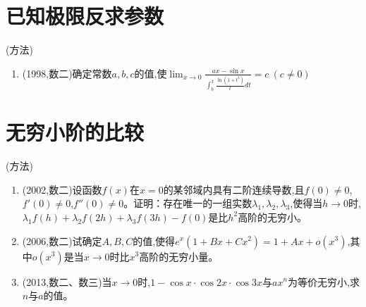 \documentclass[12pt, a4paper, oneside, UTF8]{ctexbook}
\begin{document}
\section{已知极限反求参数}
\begin{remark}(方法)

\end{remark}

\begin{enumerate}[label=\arabic*.,start=11]
    \item  (1998,数二)确定常数$a,b,c$的值,使$\lim_{x\to0}\frac{ax-\sin x}{\int_b^x\frac{\ln(1+t^3)}{t}dt}=c\ (c\neq0)$
    
    \begin{solution}
    \newpage
    \end{solution}
\end{enumerate}

\section{无穷小阶的比较}
\begin{remark}(方法)
\end{remark}
\begin{enumerate}[label=\arabic*.,start=12]
    \item  (2002,数二)设函数$f(x)$在$x=0$的某邻域内具有二阶连续导数,且$f(0)\neq0$,$f'(0)\neq0$,$f''(0)\neq0$。证明：存在唯一的一组实数$\lambda_1,\lambda_2,\lambda_3$,使得当$h\to0$时,$\lambda_1f(h)+\lambda_2f(2h)+\lambda_3f(3h)-f(0)$是比$h^2$高阶的无穷小。
    
    \begin{solution}
    \newpage
    \end{solution}
    
    \item  (2006,数二)试确定$A,B,C$的值,使得$e^x(1+Bx+Cx^2)=1+Ax+o(x^3)$,其中$o(x^3)$是当$x\to0$时比$x^3$高阶的无穷小量。
    
    \begin{solution}
    \newpage
    \end{solution}
    
    \item  (2013,数二、数三)当$x\to0$时,$1-\cos x\cdot\cos2x\cdot\cos3x$与$ax^n$为等价无穷小,求$n$与$a$的值。
    
    \begin{solution}
    \newpage
    \end{solution}
\end{enumerate}
\end{document}
